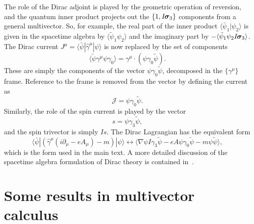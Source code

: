\documentclass[a4paper]{article}
\numberwithin{equation}{section}
\newcommand{\dt}{\! \cdot \!}
\newcommand{\la}{\langle}
\newcommand{\ra}{\rangle}
\newcommand{\lra}{\leftrightarrow}
\newcommand{\sig}{\mbox{\boldmath $\sigma$}}
\newcommand{\bsig}{\mbox{\boldmath $\sig$}}
\newcommand{\clj}{{\mathcal{J}}}
\newcommand{\dmu}{\partial_{\mu}}
\newcommand{\isk}{I \hspace{-1pt} \bsig_3}
\newcommand{\gk}{\gamma_{3}}
\newcommand{\go}{\gamma_{0}}
\newcommand{\gamum}{\gamma^\mu}
\newcommand{\hgamum}{\hat{\gamma}^\mu}
\newcommand{\psirev}{\tilde{\psi}}
\newcommand{\psibar}{\bar{\psi}}
\newcommand{\grad}{\nabla}
\begin{document}
The role of the Dirac adjoint is played by the geometric operation of
reversion, and the quantum inner product projects out the $\{1,\isk\}$
components from a general multivector.  So, for example, the real part
of the inner product $\la \psibar_1 |\psi_2\ra$ is given in the
spacetime algebra by $\la\psirev_1\psi_2\ra$ and the imaginary part by
$-\la\psirev_1\psi_2\isk\ra$.  The Dirac current $J^\mu=\la\psibar
|\hgamum |\psi\ra$ is now replaced by the set of components
%
\begin{equation}
\la \psirev \gamum \psi \go \ra = \gamum \dt (\psi \go \psirev).
\end{equation}
%
These are simply the components of the vector $\psi\go\psirev$,
decomposed in the $\{\gamum\}$ frame.  Reference to the frame is
removed from the vector by defining the current as
%
\begin{equation}
\clj = \psi \go \psirev.
\end{equation}
%
Similarly, the role of the spin current is played by the vector
%
\begin{equation}
s = \psi \gk \psirev,
\end{equation}
%
and the spin trivector is simply $Is$.  The Dirac Lagrangian has the
equivalent form
%
\begin{equation}
\la \psibar |(\hgamum(i \dmu -eA_\mu) - m)| \psi\ra
\lra \la \grad \psi I\gk \psirev - eA\psi \go \psirev 
- m \psi \psirev \ra ,
\end{equation}
%
which is the form used in the main text.  A more detailed discussion
of the spacetime algebra formulation of Dirac theory is contained
in~\cite{DGL95-elphys}.




%
\section{Some results in multivector  calculus}
\label{app-results}
%
\end{document}
